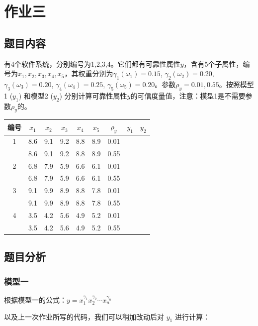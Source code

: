 \section{作业三}

\subsection{题目内容}

有4个软件系统，分别编号为1,2,3,4。它们都有可靠性属性$y$，含有5个子属性，编号为$x_1, x_2, x_3, x_4, x_5$，其权重分别为$\gamma_1(\omega_1) = 0.15$, $\gamma_2(\omega_2) = 0.20$, $\gamma_3(\omega_3) = 0.20$, $\gamma_4(\omega_4) = 0.25$, $\gamma_5(\omega_5) = 0.20$。参数$\rho_y = 0.01, 0.55$。按照模型1 ($y_1$) 和模型2 ($y_2$) 分别计算可靠性属性$y$的可信度量值，注意：模型1是不需要参数$\rho_y$的。

\begin{table}[H]
\centering
\begin{tabular}{|c|c|c|c|c|c|c|c|c|}
\hline
编号 & $x_1$ & $x_2$ & $x_3$ & $x_4$ & $x_5$ & $\rho_y$ & $y_1$ & $y_2$ \\
\hline
1 & 8.6 & 9.1 & 9.2 & 8.8 & 8.9 & 0.01 & & \\
  & 8.6 & 9.1 & 9.2 & 8.8 & 8.9 & 0.55 & & \\
\hline
2 & 6.8 & 7.9 & 5.9 & 6.6 & 6.1 & 0.01 & & \\
  & 6.8 & 7.9 & 5.9 & 6.6 & 6.1 & 0.55 & & \\
\hline
3 & 9.1 & 9.9 & 8.9 & 8.8 & 7.8 & 0.01 & & \\
  & 9.1 & 9.9 & 8.9 & 8.8 & 7.8 & 0.55 & & \\
\hline
4 & 3.5 & 4.2 & 5.6 & 4.9 & 5.2 & 0.01 & & \\
  & 3.5 & 4.2 & 5.6 & 4.9 & 5.2 & 0.55 & & \\
\hline
\end{tabular}
\end{table}

\subsection{题目分析}

\subsubsection{模型一}

根据模型一的公式：\quad $y = x_1^{\gamma_1} x_2^{\gamma_2} \cdots x_n^{\gamma_n}$

以及上一次作业所写的代码，我们可以稍加改动后对 $y_1$ 进行计算：

